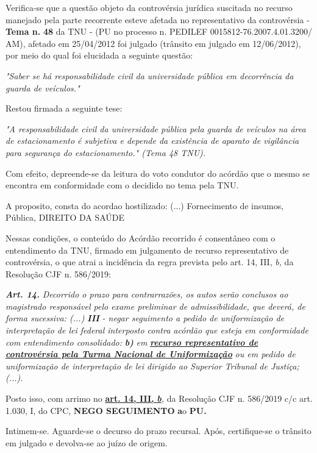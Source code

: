 \documentclass[12pt]{article}
\begin{document}
\justifying
\noindent Verifica-se que a questão objeto da controvérsia jurídica suscitada no recurso manejado pela parte recorrente esteve afetada no representativo da controvérsia - \textbf{Tema n. }\textbf{48} da TNU - (PU no processo n. PEDILEF 0015812-76.2007.4.01.3200/ AM),  afetado em 25/04/2012 foi julgado (trânsito em julgado em 12/06/2012), por meio do qual foi elucidada a seguinte questão:

\noindent \textit{"Saber se há responsabilidade civil da universidade pública em decorrência da guarda de veículos."}

\noindent Restou firmada a seguinte tese:

\noindent \textit{"A responsabilidade civil da universidade pública pela guarda de veículos na área de estacionamento é subjetiva e depende da existência de aparato de vigilância para segurança do estacionamento." (Tema 48 TNU).}

\noindent Com efeito, depreende-se da leitura do voto condutor do acórdão que o mesmo se encontra em conformidade com o decidido no  tema pela TNU.

\noindent A proposito, consta do acordao hostilizado: (...) Fornecimento de insumos, Pública, DIREITO DA SAÚDE

\noindent Nessas condições, o conteúdo do Acórdão recorrido é consentâneo com o entendimento da TNU, firmado em julgamento de recurso representativo de controvérsia, o que atrai a incidência da regra prevista pelo art. 14, III, \textit{b,} da Resolução CJF n. 586/2019:

\noindent \textit{\textbf{Art. 14.}}\textit{ Decorrido o prazo para contrarrazões, os autos serão conclusos ao magistrado responsável pelo exame preliminar de admissibilidade, que deverá, de forma sucessiva: (...) }\textit{\textbf{III }}\textit{- negar seguimento a pedido de uniformização de interpretação de lei federal interposto contra acórdão que esteja em conformidade com entendimento consolidado: }\textit{\textbf{b)}}\textit{ em }\uline{\textit{\textbf{recurso representativo de controvérsia pela Turma Nacional de Uniformização}}}\textit{ ou em pedido de uniformização de interpretação de lei dirigido ao Superior Tribunal de Justiça;(...).}

\noindent Posto isso, com arrimo no \uline{\textbf{art. 14, III, }}\uline{\textit{\textbf{b}}}\textit{,} da Resolução CJF n. 586/2019 c/c art. 1.030, I, do CPC, \textbf{NEGO SEGUIMENTO }\textbf{a}o\textbf{ PU}\textbf{.}

\noindent Intimem-se. Aguarde-se o decurso do prazo recursal. Após, certifique-se o trânsito em julgado e devolva-se ao juízo de origem.
\end{document}
